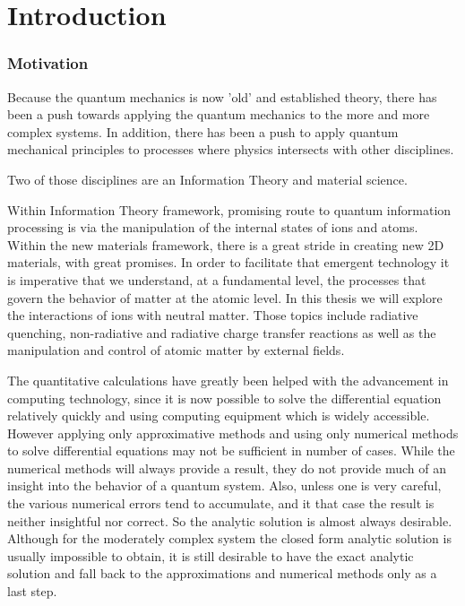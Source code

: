 \chapter{Introduction}
\label{introduction}
 
\subsection*{Motivation}

Because the quantum mechanics  is now 'old' and established theory, there has been a push towards applying the quantum mechanics to the more and more complex systems. In addition, there  has been a push to apply quantum mechanical principles to processes where physics intersects with other disciplines.

Two of those disciplines are an Information Theory and material science.

Within Information Theory framework, promising route to quantum information processing \cite{QIP} is via the manipulation of the internal states of ions and atoms. Within the new materials framework, there is a great stride in creating new 2D materials, with great promises. \cite{Nature2D}
In order to facilitate that emergent technology it is imperative that we understand, at a fundamental level, the processes that govern the behavior of matter at the atomic level. In this thesis we will explore the interactions of ions with neutral matter. Those topics include radiative quenching, non-radiative and radiative charge transfer reactions as well as the manipulation and control of atomic matter by external fields.

The quantitative calculations have greatly been helped with the advancement in computing technology, since it is now possible to solve the differential equation relatively quickly and using computing equipment which is widely accessible.  However applying only approximative methods and using only numerical methods to solve differential equations may not be sufficient in number of cases. While the numerical methods will always provide a result, they do not provide much of an insight into the behavior of a quantum system. Also, unless one is very careful, the various numerical errors tend to accumulate, and it that case the result is neither insightful nor correct. So the analytic solution is almost always desirable. Although for the moderately complex system the closed form analytic solution is usually impossible to obtain, it is still desirable to have the exact analytic solution and fall back to the approximations and numerical methods only as a last step.

